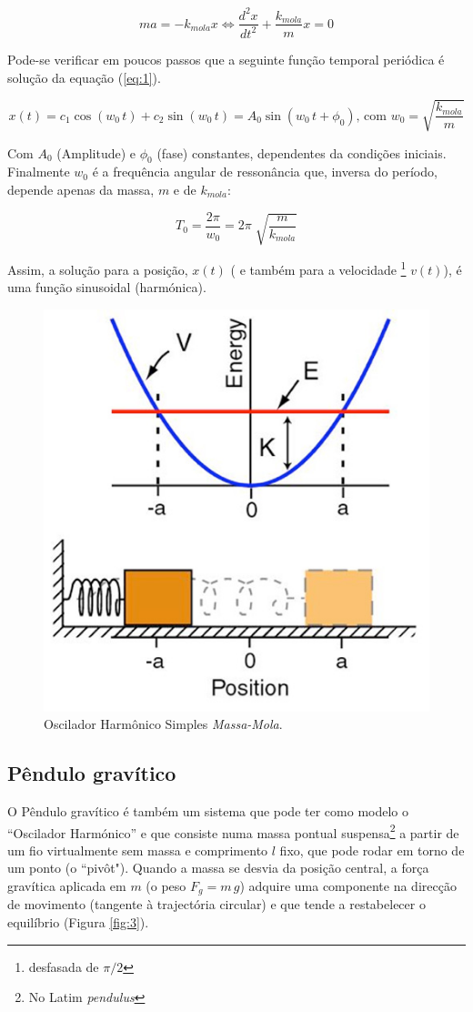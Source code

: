 \documentclass[a4paper,twoside,12pt]{article}      %
\begin{document}
\begin{equation}
	\label{eq:1} 
 m a = - k_{mola} x \Leftrightarrow \frac{d^2 x}{dt^2}  + \frac{k_{mola}}{m} x = 0
\end{equation}

Pode-se verificar em poucos passos que a seguinte função temporal periódica é solução da equação (\ref{eq:1}).

\begin{equation}
	\label{eq:solu_mola}
x(t) = c_1 \cos(w_0 \, t) + c_2 \sin(w_0 \, t) = A_0 \sin(w_0 \, t + \phi_0) \text{, com } w_0 = \sqrt{\frac{k_{mola}}{m}}
\end{equation}

Com $ A_0 $ (Amplitude) e $\phi_0$ (fase) constantes, dependentes da condições iniciais. Finalmente $w_0$ é a frequência angular de ressonância que, inversa do período, depende apenas da massa, $m$ e de $k_{mola}$:

\begin{equation}
	\label{eq:period_mola}
T_0 = \frac{2 \pi}{w_0} = 2\pi\; \sqrt{\frac{m}{k_{mola}}}	
\end{equation}

Assim, a solução para a posição, $x(t)$ ( e também para a velocidade \footnote{desfasada de $\pi/2$} $v(t)$), é uma função sinusoidal (harmónica).

\begin{figure}
	[!tbp] \centering 
	\includegraphics[width=0.5	\textwidth]{simple_harmonic_oscillator} 
	\caption{Oscilador Harmônico Simples \emph{Massa-Mola}.  \label{fig:2}} 
\end{figure}

\subsection{\sf Pêndulo gravítico}
O Pêndulo gravítico é também um sistema que pode ter como  modelo o ``Oscilador Harmónico'' e que consiste numa massa pontual suspensa\footnote{No Latim \emph{pendulus}} a partir de um fio virtualmente sem massa e comprimento $l$ fixo, que pode rodar em torno de um ponto (o ``pivôt"). Quando a massa se desvia da posição central, a força gravítica aplicada em $m$ (o peso $F_g = m \, g $) adquire uma componente na direcção de movimento (tangente à trajectória circular) e que tende a restabelecer o equilíbrio (Figura \ref{fig:3}). 
\end{document}
